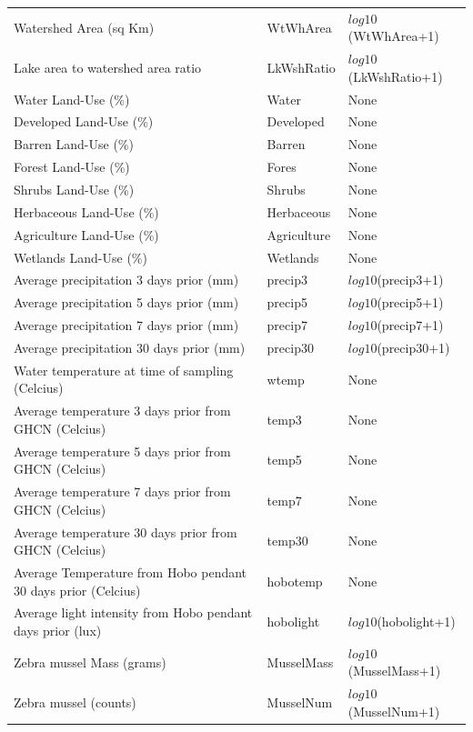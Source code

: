 \begin{center}
\begin{longtable}{p{3.5cm}p{1cm}p{3.3cm}}
Watershed Area (sq Km) &  WtWhArea & $log10$(WtWhArea+1) \\
Lake area to watershed area ratio & LkWshRatio &  $log10$(LkWshRatio+1) \\
Water Land-Use (\%) & Water &  None \\
Developed Land-Use  (\%) & Developed & None \\
Barren Land-Use (\%) & Barren & None \\
Forest Land-Use (\%) & Fores & None \\
Shrubs Land-Use (\%) & Shrubs & None \\
Herbaceous Land-Use (\%) & Herbaceous  & None \\
Agriculture Land-Use (\%) & Agriculture & None \\
Wetlands Land-Use (\%) & Wetlands & None \\
Average precipitation 3 days prior (mm) & precip3 &  $log10$(precip3+1) \\
Average precipitation 5 days prior (mm)  & precip5 & $log10$(precip5+1) \\
Average precipitation 7 days prior (mm) & precip7 &  $log10$(precip7+1) \\
Average precipitation 30 days prior (mm) & precip30 &  $log10$(precip30+1) \\
Water temperature at time of sampling (Celcius) & wtemp & None \\
Average temperature 3 days prior from GHCN (Celcius) & temp3&  None \\
Average temperature 5 days prior from GHCN (Celcius) & temp5 & None \\
Average temperature 7 days prior  from GHCN (Celcius) &  temp7 & None \\
Average temperature 30 days prior from GHCN (Celcius) & temp30 &  None \\
Average Temperature from Hobo pendant 30 days prior (Celcius) & hobotemp & None \\
Average light intensity from Hobo pendant days prior (lux) & hobolight & $log10$(hobolight+1) \\
Zebra mussel Mass (grams) & MusselMass &  $log10$(MusselMass+1) \\
Zebra mussel (counts) &  MusselNum & $log10$(MusselNum+1) \\
\hline
\end{longtable}
\end{center}



